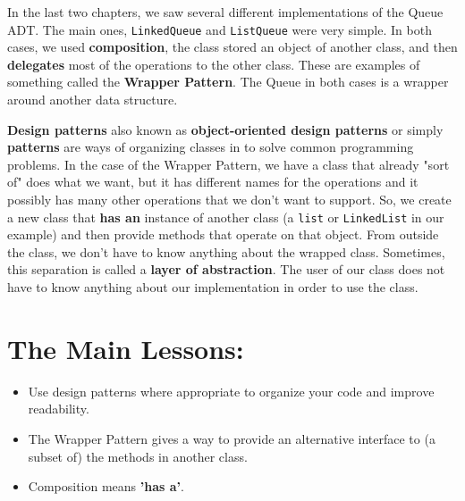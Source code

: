 In the last two chapters, we saw several different implementations of the Queue ADT.
The main ones, \texttt{LinkedQueue} and \texttt{ListQueue} were very simple.
In both cases, we used \textbf{composition}, the class stored an object of another class, and then \textbf{delegates} most of the operations to the other class.
These are examples of something called the \textbf{Wrapper Pattern}.
The Queue in both cases is a wrapper around another data structure.


\textbf{Design patterns} also known as \textbf{object-oriented design patterns} or simply \textbf{patterns} are ways of organizing classes in to solve common programming problems.
In the case of the Wrapper Pattern, we have a class that already "sort of" does what we want, but it has different names for the operations and it possibly has many other operations that we don't want to support.
So, we create a new class that \textbf{has an} instance of another class (a \texttt{list} or \texttt{LinkedList} in our example) and then provide methods that operate on that object.
From outside the class, we don't have to know anything about the wrapped class.
Sometimes, this separation is called a \textbf{layer of abstraction}.
The user of our class does not have to know anything about our implementation in order to use the class.

\section{The Main Lessons:}

\begin{itemize}

\item Use design patterns where appropriate to organize your code and improve readability.

\item The Wrapper Pattern gives a way to provide an alternative interface to (a subset of) the methods in another class.

\item Composition means \textbf{'has a'}.

\end{itemize}
